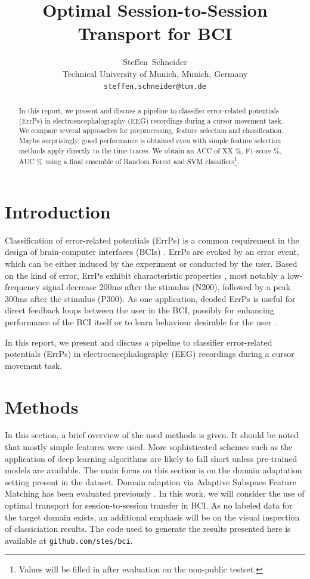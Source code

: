 \documentclass[10pt,a4paper]{article}
\title{Optimal Session-to-Session Transport for BCI}
\author{
  Steffen~Schneider\\
  Technical University of Munich, Munich, Germany\\
  \texttt{steffen.schneider@tum.de}
}
\begin{document}
\maketitle

\begin{abstract}
    In this report, we present and discuss a pipeline to classifier error-related potentials (ErrPs) in electroencephalography (EEG) recordings during a cursor movement task.
    We compare several approaches for preprocessing, feature selection and classification.
    Maybe surprisingly, good performance is obtained even with simple feature selection methods apply directly to the time traces.
    We obtain an ACC of XX \%, F1-score \%, AUC \% using a final ensemble of Random Forest and SVM classifiers\footnote{Values will be filled in after evaluation on the non-public testset.}.
\end{abstract}

\section{Introduction}

Classification of error-related potentials (ErrPs) is a common requirement in the design of brain-computer interfaces (BCIs) \cite{silvoni2011brain,lebedev2006brain,Ehrlich2016}.
ErrPs are evoked by an error event, which can be either induced by the experiment or conducted by the user.
Based on the kind of error, ErrPs exhibit characteristic properties \cite{Spuler2015}, most notably a low-frequency signal decrease 200ms after the stimulus (N200), followed by a peak 300ms after the stimulus (P300).
As one application, deoded ErrPs is useful for direct feedback loops between the user in the BCI, possibly for enhancing performance of the BCI itself or to learn behaviour desirable for the user \cite{Ehrlich2016}.

In this report, we present and discuss a pipeline to classifier error-related potentials (ErrPs) in electroencephalography (EEG) recordings during a cursor movement task.

\section{Methods}

In this section, a brief overview of the used methods is given.
It should be noted that mostly simple features were used.
More sophisticated schemes such as the application of deep learning algorithms \cite{Stober2015} are likely to fall short unless pre-trained models are available.
The main focus on this section is on the domain adaptation setting present in the dataset.
Domain adaption via Adaptive Subspace Feature Matching has been evaluated previously \cite{Chai2017}.
In this work, we will consider the use of optimal transport \cite{Cuturi2013,Flamary2016,Courty} for session-to-session transfer in BCI.
As no labeled data for the target domain exists, an additional emphasis will be on the visual inspection of classiciation results.
The code used to generate the results presented here is available at \texttt{github.com/stes/bci}.
\end{document}
